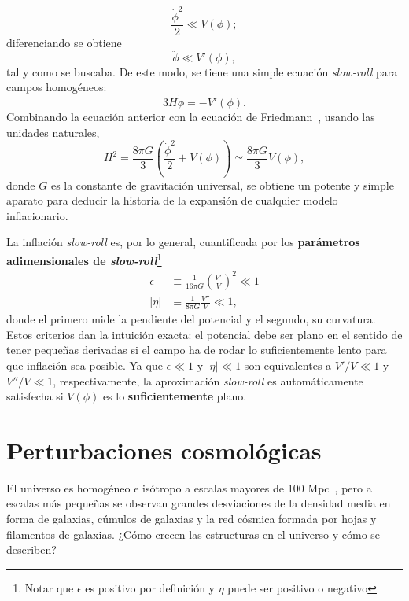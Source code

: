 \begin{equation}
    \frac{\dot{\phi}^2}{2}\ll V(\phi);
\end{equation}
diferenciando se obtiene
\begin{equation}
    \ddot{\phi}\ll V'(\phi),
\end{equation}
tal y como se buscaba. De este modo, se tiene una simple ecuación \textit{slow-roll} para campos homogéneos:
\begin{equation}
    3H\dot{\phi}=-V'(\phi).
\end{equation}
Combinando la ecuación anterior con la ecuación de Friedmann~\cite{friedmann1922125}, usando las unidades naturales,
\begin{equation}
    H^2=\frac{8\pi G}{3}\left(\frac{\dot{\phi}^2}{2}+V(\phi)\right)\simeq \frac{8\pi G}{3}V(\phi),
\end{equation}
donde \(G\) es la constante de gravitación universal, se obtiene un potente y simple aparato para deducir la historia de la expansión de cualquier modelo inflacionario.

La inflación \textit{slow-roll} es, por lo general, cuantificada por los \textbf{parámetros adimensionales de \textit{slow-roll}}\footnote{Notar que \(\epsilon\) es positivo por definición y \(\eta\) puede ser positivo o negativo}
\begin{subequations}
    \begin{align}
        \epsilon          & \equiv\frac{1}{16\pi G}\left(\frac{V'}{V}\right)^2\ll 1 \\
        \left|\eta\right| & \equiv\frac{1}{8\pi G}\frac{V''}{V}\ll 1,
    \end{align}
    \label{eq::slowroll}
\end{subequations}
donde el primero mide la pendiente del potencial y el segundo, su curvatura. Estos criterios dan la intuición exacta: el potencial debe ser plano en el sentido de tener pequeñas derivadas si el campo ha de rodar lo suficientemente lento para que inflación sea posible. Ya que \(\epsilon\ll 1\) y \(\left|\eta\right|\ll 1\) son equivalentes a \(V'/V\ll 1\) y \(V''/V\ll 1\), respectivamente, la aproximación \textit{slow-roll} es automáticamente satisfecha si \(V(\phi)\) es lo \textbf{suficientemente} plano.
\section{Perturbaciones cosmológicas}
El universo es homogéneo e isótropo a escalas mayores de 100 Mpc~\cite{baumann2022cosmology}, pero a escalas más pequeñas se observan grandes desviaciones de la densidad media en forma de galaxias, cúmulos de galaxias y la red cósmica formada por hojas y filamentos de galaxias. ¿Cómo crecen las estructuras en el universo y cómo se describen?

